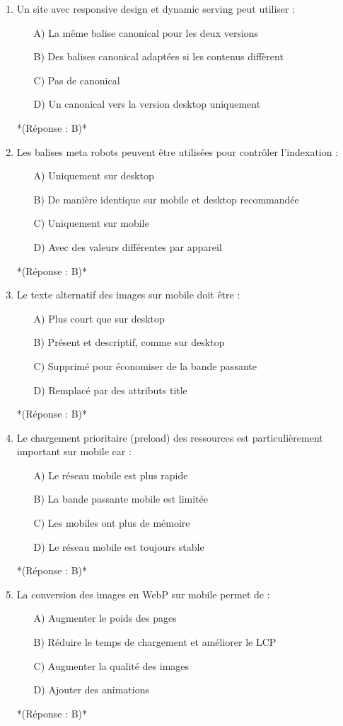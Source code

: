 \documentclass[12pt,a4paper,twoside]{report}
\begin{document}
\begin{enumerate}
\item Un site avec responsive design et dynamic serving peut utiliser :
\begin{itemize}
\item[A)] La même balise canonical pour les deux versions
\item[B)] Des balises canonical adaptées si les contenus diffèrent
\item[C)] Pas de canonical
\item[D)] Un canonical vers la version desktop uniquement
\end{itemize}
*(Réponse : B)*

\item Les balises meta robots peuvent être utilisées pour contrôler l'indexation :
\begin{itemize}
\item[A)] Uniquement sur desktop
\item[B)] De manière identique sur mobile et desktop recommandée
\item[C)] Uniquement sur mobile
\item[D)] Avec des valeurs différentes par appareil
\end{itemize}
*(Réponse : B)*

\item Le texte alternatif des images sur mobile doit être :
\begin{itemize}
\item[A)] Plus court que sur desktop
\item[B)] Présent et descriptif, comme sur desktop
\item[C)] Supprimé pour économiser de la bande passante
\item[D)] Remplacé par des attributs title
\end{itemize}
*(Réponse : B)*

\item Le chargement prioritaire (preload) des ressources est particulièrement important sur mobile car :
\begin{itemize}
\item[A)] Le réseau mobile est plus rapide
\item[B)] La bande passante mobile est limitée
\item[C)] Les mobiles ont plus de mémoire
\item[D)] Le réseau mobile est toujours stable
\end{itemize}
*(Réponse : B)*

\item La conversion des images en WebP sur mobile permet de :
\begin{itemize}
\item[A)] Augmenter le poids des pages
\item[B)] Réduire le temps de chargement et améliorer le LCP
\item[C)] Augmenter la qualité des images
\item[D)] Ajouter des animations
\end{itemize}
*(Réponse : B)*

\end{enumerate}
\end{document}
